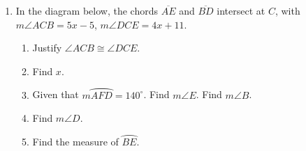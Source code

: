 \documentclass[12pt, twoside]{article}
\begin{document}
\begin{enumerate}
\newpage


  \item In the diagram below, the chords $\overline{AE}$ and $\overline{BD}$ intersect at $C$, with $m \angle ACB = 5x-5$, $m \angle DCE = 4x+11$.
  \begin{enumerate}
    \item Justify $\angle ACB \cong \angle DCE$. \vspace{1cm}
    \item Find $x$.  \vspace{3cm}
    \item Given that $m \wideparen{AFD}=140^\circ$. Find $m\angle E$. Find $m\angle B$.  \vspace{1cm}
    \item Find $m\angle D$.  \vspace{3cm}
    \item Find the measure of $\wideparen{BE}$.  \vspace{1cm} %

  \end{enumerate}
      \begin{center}
    \end{center}

\end{enumerate}
\end{document}
